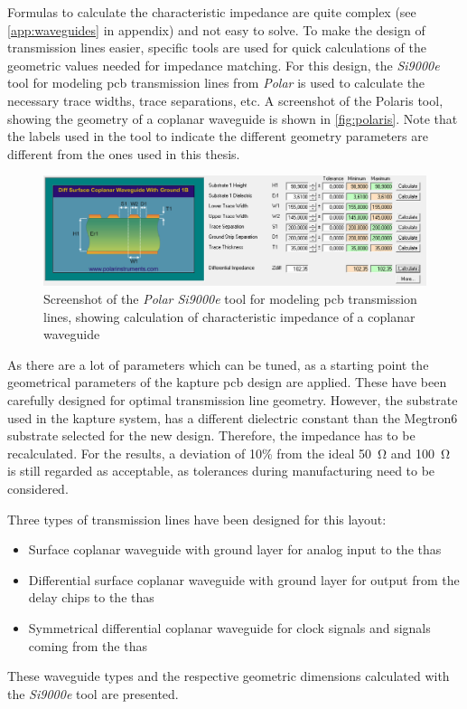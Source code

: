 Formulas to calculate the characteristic impedance are quite complex (see \autoref{app:waveguides} in appendix) and not easy to solve.
To make the design of transmission lines easier, specific tools are used for quick calculations of the geometric values needed for impedance matching.
For this design, the \textit{Si9000e} tool for modeling \gls{pcb} transmission lines from \textit{Polar} is used to calculate the necessary trace widths, trace separations, etc.
A screenshot of the Polaris tool, showing the geometry of a coplanar waveguide is shown in \autoref{fig:polaris}. Note that the labels used in the tool to indicate the different geometry parameters are different from the ones used in this thesis.
\begin{figure}[tb]
	\centering
	\includegraphics[width = \textwidth]{chap/04-theresa/img/polaris}
	\caption[Screenshot of the \textit{Polar Si9000e}]{Screenshot of the \textit{Polar Si9000e} tool for modeling \gls{pcb} transmission lines, showing calculation of characteristic impedance of a coplanar waveguide}
	\label{fig:polaris}
\end{figure}

As there are a lot of parameters which can be tuned, as a starting point the geometrical parameters of the \gls{kapture} \gls{pcb} design are applied. 
These have been carefully designed for optimal transmission line geometry.
However, the substrate used in the \gls{kapture} system, has a different dielectric constant than the Megtron6 substrate selected for the new design. 
Therefore, the impedance has to be recalculated. 
For the results, a deviation of 10\% from the ideal \SI{50}{\ohm} and \SI{100}{\ohm} is still regarded as acceptable, as tolerances during manufacturing need to be considered.

Three types of transmission lines have been designed for this layout:
\begin{itemize}
	\item Surface coplanar waveguide with ground layer for analog input to the \glspl{tha} 
	\item Differential surface coplanar waveguide with ground layer for output from the delay chips to the \glspl{tha}
	\item Symmetrical differential coplanar waveguide for clock signals and signals coming from the \glspl{tha}
\end{itemize}
These waveguide types and the respective geometric dimensions calculated with the \textit{Si9000e} tool are presented.

